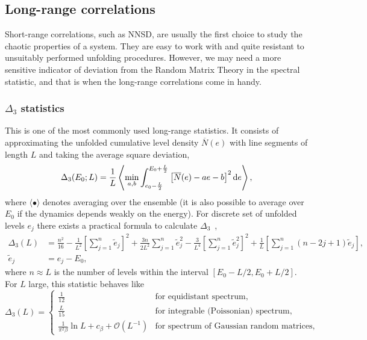 \documentclass[a4paper,11pt,twoside]{article}
\begin{document}
    \subsection{Long-range correlations}
        Short-range correlations, such as NNSD, are usually the first choice to study the chaotic properties of a system.
        They are easy to work with and quite resistant to unsuitably performed unfolding procedures.
        However, we may need a more sensitive indicator of deviation from the Random Matrix Theory in the spectral statistic, and that is when the long-range correlations come in handy.

        \subsubsection{$\Delta_{3}$ statistics}
            This is one of the most commonly used long-range statistics.
            It consists of approximating the unfolded cumulative level density $\overline{N}(e)$ with line segments of length $L$ and taking the average square deviation,
            \begin{equation}
                \Delta_{3}(E_{0};L)
                =\frac{1}{L}\left\langle\min_{a,b}\int_{e_{0}-\frac{L}{2}}^{E_{0}+\frac{L}{2}}\left[\overline{N}(e)-ae-b\right]^{2}\mathrm{d} e\right\rangle,
            \end{equation}
            where $\langle\bullet\rangle$ denotes averaging over the ensemble (it is also possible to average over $E_{0}$ if the dynamics depends weakly on the energy).
            For discrete set of unfolded levels $e_{j}$ there exists a practical formula to calculate $\Delta_{3}$~\cite{Boh75},
            \begin{align}
                \Delta_{3}(L)
                    &=\frac{n^{2}}{16}-\frac{1}{L^{2}}\left[\sum_{j=1}^{n}\tilde{e}_{j}\right]^{2}+\frac{3n}{2L^{2}}\sum_{j=1}^{n}\tilde{e}_{j}^{2}-\frac{3}{L^{4}}\left[\sum_{j=1}^{n}\tilde{e}_{j}^{2}\right]^{2}+\frac{1}{L}\left[\sum_{j=1}^{n}\left(n-2j+1\right)\tilde{e}_{j}\right],\\
                \tilde{e}_{j}&=e_{j}-E_{0},\nonumber
            \end{align}
            where $n\approx L$ is the number of levels within the interval $[E_{0}-L/2,E_{0}+L/2]$.
            For $L$ large, this statistic behaves like
            \begin{equation}
                \Delta_{3}(L)=\left\{\begin{array}{ll}
                    \frac{1}{12} & \text{for equidistant spectrum},\\
                    \frac{L}{15} & \text{for integrable (Poissonian) spectrum},\\
                    \frac{1}{\pi^{2}\beta}\ln L+c_{\beta}+\mathcal{O}(L^{-1}) & \text{for spectrum of Gaussian random matrices},
                \end{array}\right.
                \label{eq:Delta3}
            \end{equation}
\end{document}
